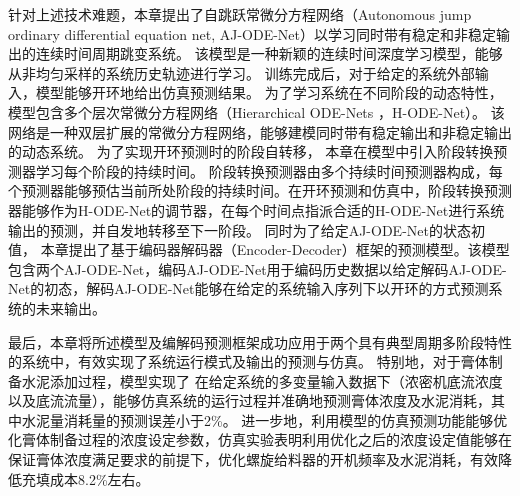 针对上述技术难题，本章提出了自跳跃常微分方程网络（Autonomous jump ordinary differential equation net, AJ-ODE-Net）以学习同时带有稳定和非稳定输出的连续时间周期跳变系统。
该模型是一种新颖的连续时间深度学习模型，能够从非均匀采样的系统历史轨迹进行学习。
训练完成后，对于给定的系统外部输入，模型能够开环地给出仿真预测结果。
为了学习系统在不同阶段的动态特性，模型包含多个层次常微分方程网络（Hierarchical ODE-Nets ，H-ODE-Net）。
该网络是一种双层扩展的常微分方程网络，能够建模同时带有稳定输出和非稳定输出的动态系统。
为了实现开环预测时的阶段自转移，
本章在模型中引入阶段转换预测器学习每个阶段的持续时间。
阶段转换预测器由多个持续时间预测器构成，每个预测器能够预估当前所处阶段的持续时间。在开环预测和仿真中，阶段转换预测器能够作为H-ODE-Net的调节器，在每个时间点指派合适的H-ODE-Net进行系统输出的预测，并自发地转移至下一阶段。
同时为了给定AJ-ODE-Net的状态初值，
本章提出了基于编码器解码器（Encoder-Decoder）框架的预测模型。该模型包含两个AJ-ODE-Net，编码AJ-ODE-Net用于编码历史数据以给定解码AJ-ODE-Net的初态，解码AJ-ODE-Net能够在给定的系统输入序列下以开环的方式预测系统的未来输出。

最后，本章将所述模型及编解码预测框架成功应用于两个具有典型周期多阶段特性的系统中，有效实现了系统运行模式及输出的预测与仿真。
特别地，对于膏体制备水泥添加过程，模型实现了
在给定系统的多变量输入数据下（浓密机底流浓度以及底流流量），能够仿真系统的运行过程并准确地预测膏体浓度及水泥消耗，其中水泥量消耗量的预测误差小于2\%。
进一步地，利用模型的仿真预测功能能够优化膏体制备过程的浓度设定参数，仿真实验表明利用优化之后的浓度设定值能够在保证膏体浓度满足要求的前提下，优化螺旋给料器的开机频率及水泥消耗，有效降低充填成本8.2\%左右。

